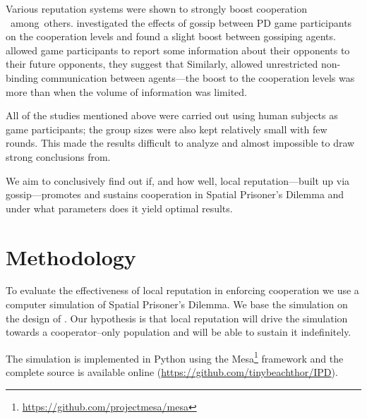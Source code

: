 \documentclass[runningheads]{llncs}
\begin{document}
Various reputation systems were shown to strongly boost cooperation \cite{simple-reputation, dong-reputation}~among~others.
\cite{strangers-gossip} investigated the effects of gossip between PD game participants on the cooperation levels and found a slight boost between gossiping agents.
\cite{public-private-monitoring} allowed game participants to report some information about their opponents to their future opponents, they suggest that 
Similarly, \cite{cooperation-communication} allowed unrestricted non-binding communication between agents---the boost to the cooperation levels was more than when the volume of information was limited.

All of the studies mentioned above were carried out using human subjects as game participants; the group sizes were also kept relatively small with few rounds.
This made the results difficult to analyze and almost impossible to draw strong conclusions from.

We aim to conclusively find out if, and how well, local reputation---built up via gossip---promotes and sustains cooperation in Spatial Prisoner’s Dilemma and under what parameters does it yield optimal results.
%
%
%
\section{Methodology}
To evaluate the effectiveness of local reputation in enforcing cooperation we use a computer simulation of Spatial Prisoner’s Dilemma.
We base the simulation on the design of \cite{smaldino}.
Our hypothesis is that local reputation will drive the simulation towards a cooperator--only population and will be able to sustain it indefinitely.

The simulation is implemented in Python using the Mesa\footnote{\url{https://github.com/projectmesa/mesa}} framework and the complete source is available online (\url{https://github.com/tinybeachthor/IPD}).
\end{document}
